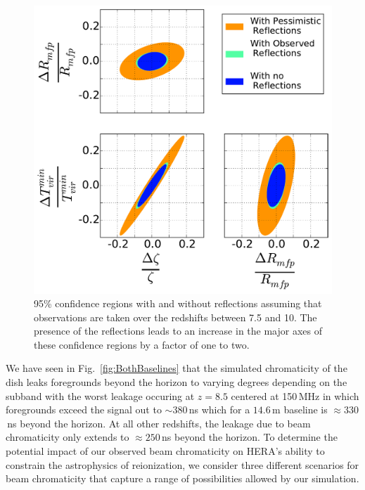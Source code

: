 \documentclass[twocolumn]{emulateapj}
\begin{document}
\begin{figure}[h!]
\includegraphics[width=.5\textwidth]{figures/reionization_triangle_compare_v2.pdf}
\caption{95\% confidence regions with and without reflections assuming that observations are taken over the redshifts between 7.5 and 10. The presence of the reflections leads to an increase in the major axes of these confidence regions by a factor of one to two.}
\label{fig:Confidence}
\end{figure}


We have seen in Fig.~\ref{fig:BothBaselines} that the simulated chromaticity of the dish leaks foregrounds beyond the horizon to varying degrees depending on the subband with the worst leakage occuring at $z=8.5$ centered at 150\,MHz in which foregrounds exceed the signal out to $\sim 380$\,ns which for a $14.6$\,m baseline is $\approx 330$\,ns beyond the horizon. At all other redshifts, the leakage due to beam chromaticity only extends to $\approx 250$\,ns beyond the horizon. To determine the potential impact of our observed beam chromaticity on HERA's ability to constrain the astrophysics of reionization, we consider three different scenarios for beam chromaticity that capture a range of possibilities allowed by our simulation. 
\end{document}
